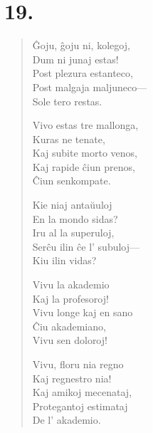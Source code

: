 \section*{19.}

{\centering{}\par}

\begin{verse}

\begin{patverse} \vin \vin 
Ĝoju, ĝoju ni, kolegoj,\\
Dum ni junaj estas!\\
Post plezura estanteco,\\
Post malgaja maljuneco---\\
Sole tero restas.
\end{patverse}

\pstars

\begin{patverse} \vin \vin 
Vivo estas tre mallonga,\\
Kuras ne tenate,\\
Kaj subite morto venos,\\
Kaj rapide ĉiun prenos,\\
Ĉiun senkompate.
\end{patverse}

\pstars

\begin{patverse} \vin \vin
Kie niaj antaŭuloj\\
En la mondo sidas?\\
Iru al la superuloj,\\
Serĉu ilin ĉe l' subuloj---\\
Kiu ilin vidas?
\end{patverse}

\pstars

\newpage

\begin{patverse} \vin \vin
Vivu la akademio\\
Kaj la profesoroj!\\
Vivu longe kaj en sano\\
Ĉiu akademiano,\\
Vivu sen doloroj!
\end{patverse}

\pstars

\begin{patverse} \vin \vin
Vivu, floru nia regno\\
Kaj regnestro nia!\\
Kaj amikoj mecenataj,\\
Protegantoj estimataj\\
De l' akademio.
\end{patverse}


\end{verse}
